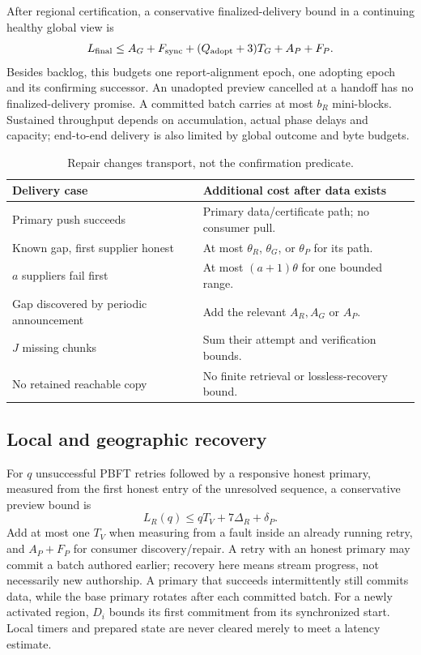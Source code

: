 \documentclass[11pt,a4paper,onecolumn]{article}
\theoremstyle{remark}\newtheorem{example}[definition]{Example}
\begin{document}
After regional certification, a conservative finalized-delivery bound in a
continuing healthy global view is
\begin{equation}\label{eq:deliver}
 L_{\rm final}\leq A_G+F_{\rm sync}+(Q_{\rm adopt}+3)T_G+A_P+F_P.
\end{equation}
Besides backlog, this budgets one report-alignment epoch, one adopting epoch
and its confirming successor. An unadopted preview cancelled at a handoff has
no finalized-delivery promise. A committed batch carries at most $b_R$ mini-blocks.
Sustained throughput depends on accumulation, actual phase delays and capacity;
end-to-end delivery is also limited by global outcome and byte budgets.

\begin{table}[htbp]\centering\small
\begin{tabularx}{\textwidth}{@{}p{}Y@{}}\toprule
Delivery case & Additional cost after data exists\\\midrule
Primary push succeeds & Primary data/certificate path; no consumer pull.\\
Known gap, first supplier honest & At most $\theta_R$, $\theta_G$, or $\theta_P$ for its path.\\
$a$ suppliers fail first & At most $(a+1)\theta$ for one bounded range.\\
Gap discovered by periodic announcement & Add the relevant $A_R,A_G$ or $A_P$.\\
$J$ missing chunks & Sum their attempt and verification bounds.\\
No retained reachable copy & No finite retrieval or lossless-recovery bound.\\\bottomrule
\end{tabularx}
\caption{Repair changes transport, not the confirmation predicate.}
\end{table}

\subsection{Local and geographic recovery}\label{sec:recoverybounds}

For $q$ unsuccessful PBFT retries followed by a responsive honest primary,
measured from the first honest entry of the unresolved sequence, a conservative
preview bound is
\begin{equation}\label{eq:localrecover}
 L_R(q)\leq qT_V+7\Delta_R+\delta_P.
\end{equation}
Add at most one $T_V$ when measuring from a fault inside an already running
retry, and $A_P+F_P$ for consumer discovery/repair. A retry with an honest
primary may commit a batch authored earlier; recovery here means stream
progress, not necessarily new authorship. A primary that succeeds intermittently
still commits data, while the base primary rotates after each committed batch.
For a newly activated region, $D_i$ bounds its first commitment from its
synchronized start. Local timers and prepared state are never cleared merely
to meet a latency estimate.
\end{document}
